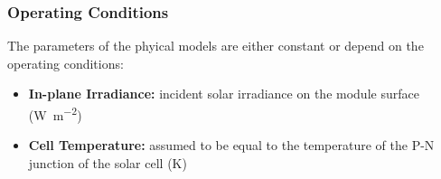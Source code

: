 \begin{frame}    
    \frametitle{Operating Conditions}   
    The parameters of the phyical models are either constant or depend
    on the operating conditions:
    \vspace*{0.3cm}
    \begin{itemize}
        \item \textbf{In-plane Irradiance:} incident solar irradiance on the module surface (\si{\watt\per\square\meter})
        \item \textbf{Cell Temperature:} assumed to be equal to the temperature of the P-N junction of the solar cell (\si{\kelvin})
    \end{itemize}
\end{frame}
